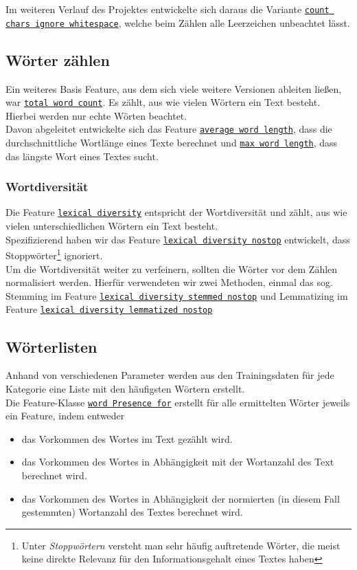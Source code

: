 \documentclass[
	11pt,
	a4paper
]{scrartcl}
\newcommand{\code}[1]{\texttt{\ul{#1}}}
\begin{document}
Im weiteren Verlauf des Projektes entwickelte sich daraus die Variante \code{count chars ignore whitespace}, welche beim Zählen alle
Leerzeichen unbeachtet lässt. 

\subsection{Wörter zählen}
Ein weiteres Basis Feature, aus dem sich viele weitere Versionen ableiten ließen, war \code{total word count}. Es zählt, aus wie vielen
Wörtern ein Text besteht. Hierbei werden nur echte Wörten beachtet.\\
Davon abgeleitet entwickelte sich das Feature \code{average word length}, dass die durchschnittliche Wortlänge eines Texte berechnet und
\code{max word length}, dass das längste Wort eines Textes sucht.

\subsubsection{Wortdiversität}
Die Feature \code{lexical diversity} entspricht der Wortdiversität und zählt, aus wie vielen unterschiedlichen Wörtern ein Text besteht.\\
Spezifizierend haben wir das Feature \code{lexical diversity nostop} entwickelt, dass Stoppwörter\footnote{Unter \emph{Stoppwörtern}
versteht man sehr häufig auftretende Wörter, die meist keine direkte Relevanz für den Informationsgehalt eines Textes haben} ignoriert. \\

Um die Wortdiversität weiter zu verfeinern, sollten die Wörter vor dem Zählen normalisiert werden. Hierfür verwendeten wir zwei Methoden,
einmal das sog. Stemming im Feature \code{lexical diversity stemmed nostop} und Lemmatizing im Feature \code{lexical diversity lemmatized
nostop}


\subsection{Wörterlisten}
Anhand von verschiedenen Parameter werden aus den Trainingsdaten für jede Kategorie eine Liste mit den häufigsten Wörtern erstellt.\\
Die Feature-Klasse \code{word Presence for} erstellt für alle ermittelten Wörter jeweils ein Feature, indem entweder
\begin{itemize}[itemsep=0pt,parsep=0pt]
	\item das Vorkommen des Wortes im Text gezählt wird.
	\item das Vorkommen des Wortes in Abhängigkeit mit der Wortanzahl des Text berechnet wird.
	\item das Vorkommen des Wortes in Abhängigkeit der normierten (in diesem Fall gestemmten) Wortanzahl des Textes berechnet wird.
\end{itemize}
\end{document}
